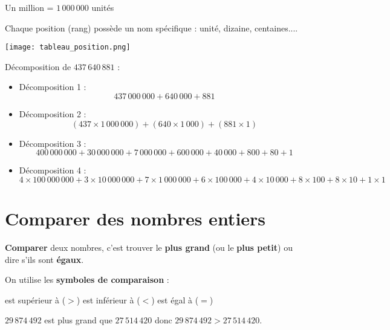 \begin{pageCours}
\begin{Ex}
Un million = $1\,000\,000$ unités
\end{Ex}

\begin{Voc}
Chaque position (rang) possède un nom spécifique : unité, dizaine, centaines....
    
\begin{center}
    \texttt{[image: tableau\_position.png]}
\end{center}
\end{Voc}

\begin{Mt}
Décomposition de $437\,640\,881$ :
\begin{itemize}
\item Décomposition 1 : 
\[437\,000\,000+640\,000+881\]
\item Décomposition 2 :
\[(437\times1\,000\,000)+(640\times 1\,000)+(881\times1)\]
\item Décomposition 3 :
\[400\,000\,000+30\,000\,000+7\,000\,000+600\,000+40\,000+800+80+1\]
\item Décomposition 4 :
\[4\times100\,000\,000+3\times10\,000\,000+7\times1\,000\,000+6\times100\,000+4\times10\,000+8\times100+8\times10+1\times1\]
\end{itemize}
\end{Mt}

\section{Comparer des nombres entiers}

\begin{Def}
\textbf{Comparer} deux nombres, c'est trouver le \textbf{plus grand} (ou le \textbf{plus petit}) ou dire s'ils sont \textbf{égaux}.

On utilise les \textbf{symboles de comparaison} :
\begin{center}
est supérieur à ($>$) \hspace{1cm} est inférieur à ($<$) \hspace{1cm} est égal à ($=$)
\end{center}
\end{Def}

\begin{Ex}
$29\,874\,492$ est plus grand que $27\,514\,420$ donc $29\,874\,492>27\,514\,420$.
\end{Ex}



\end{pageCours}
